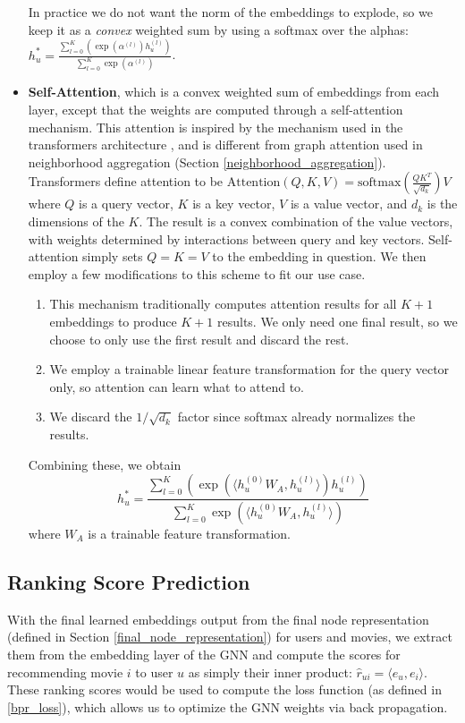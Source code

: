 \documentclass{article}
\begin{document}
\begin{itemize}
    In practice we do not want the norm of the embeddings to explode, so we keep it as a \textit{convex} weighted sum by using a softmax over the alphas:
    $h_u^*=\frac{\sum_{l=0}^K (\exp(\alpha^{(l)})h_u^{(l)})}{\sum_{l=0}^K \exp(\alpha^{(l)})}$.
    \item \textbf{Self-Attention}, which is a convex weighted sum of embeddings from each layer, except that the weights are computed through a self-attention mechanism. This attention is inspired by the mechanism used in the transformers architecture \cite{transformer}, and is different from graph attention used in neighborhood aggregation (Section \ref{neighborhood_aggregation}). Transformers define attention to be
    $\text{Attention}(Q,K,V)=\text{softmax}(\frac{QK^T}{\sqrt{d_k}})V$
    where $Q$ is a query vector, $K$ is a key vector, $V$ is a value vector, and $d_k$ is the dimensions of the $K$. The result is a convex combination of the value vectors, with weights determined by interactions between query and key vectors. Self-attention simply sets $Q=K=V$ to the embedding in question. We then employ a few modifications to this scheme to fit our use case.
    \begin{enumerate}
        \item This mechanism traditionally computes attention results for all $K+1$ embeddings to produce $K+1$ results. We only need one final result, so we choose to only use the first result and discard the rest.
        \item We employ a trainable linear feature transformation for the query vector only, so attention can learn what to attend to.
        \item We discard the $1/\sqrt{d_k}$ factor since softmax already normalizes the results.
    \end{enumerate}
    Combining these, we obtain
    $$h_u^*=\frac{\sum_{l=0}^K (\exp(\langle h_u^{(0)}W_A, h_u^{(l)}\rangle)h_u^{(l)})}{\sum_{l=0}^K \exp(\langle h_u^{(0)}W_A, h_u^{(l)}\rangle)}$$
    where $W_A$ is a trainable feature transformation.
\end{itemize}

\subsection{Ranking Score Prediction}

With the final learned embeddings output from the final node representation (defined in Section \ref{final_node_representation}) for users and movies, we extract them from the embedding layer of the GNN and compute the scores for recommending movie $i$ to user $u$ as simply their inner product: $\hat r_{ui} = \langle e_u {,} e_i \rangle$.
These ranking scores would be used to compute the loss function (as defined in \ref{bpr_loss}), which allows us to optimize the GNN weights via back propagation.
\end{document}
